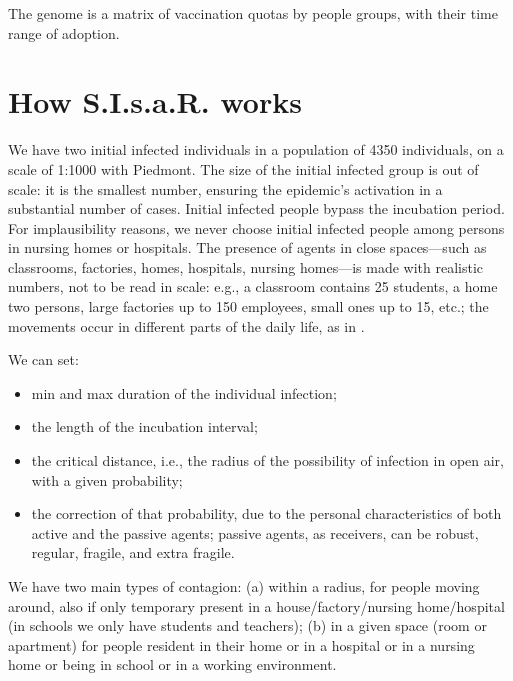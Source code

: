 \documentclass[graybox]{svmult}
\begin{document}
The genome is a matrix of vaccination quotas by people groups, with their time range of adoption. 


\section{How S.I.s.a.R. works}
\label{howWorks}

We have two initial infected individuals in a population of 4350 individuals, on a scale of 1:1000 with Piedmont. The size of the initial infected group is out of scale: it is the smallest number, ensuring the epidemic's activation in a substantial number of cases. Initial infected people bypass the incubation period. For implausibility reasons, we never choose initial infected people among persons in nursing homes or hospitals. The presence of agents in close spaces---such as classrooms, factories, homes, hospitals, nursing homes---is made with realistic numbers, not to be read in scale: e.g., a classroom contains 25 students, a home two persons, large factories up to 150 employees, small ones up to 15, etc.; the movements occur in different parts of the daily life, as in \cite{ghorbani2020assocc}.

We can set: 
\begin{itemize}
\item min and max duration of the individual infection;

\item the length of the incubation interval;

\item the critical distance, i.e., the radius of the possibility of infection in open air, with a given probability;

\item the correction of that probability, due to the personal characteristics of both active and the passive agents; passive agents, as receivers, can be robust, regular, fragile, and extra fragile.

\end{itemize} 

We have two main types of contagion: (a) within a radius, for people moving around, also if only temporary present in a house/factory/nursing home/hospital (in schools we only have students and teachers); (b) in a given space (room or apartment) for people resident in their home or in a hospital or in a nursing home or being in school or in a working environment.
\end{document}
